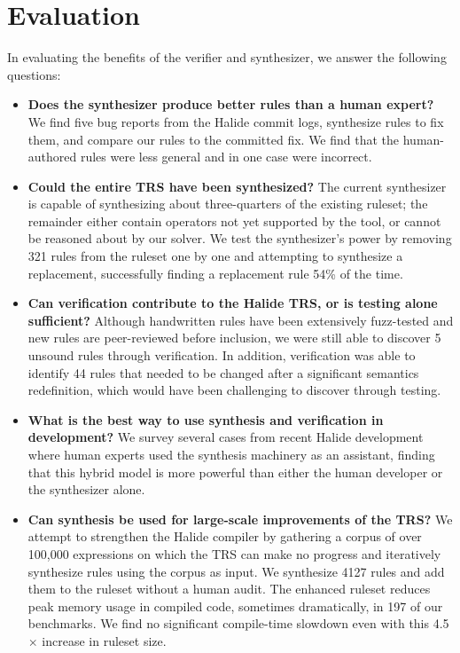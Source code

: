 \documentclass[acmsmall,review,anonymous]{acmart}\settopmatter{printfolios=true,printccs=false,printacmref=false}
\begin{document}
\section{Evaluation}

\newcommand{\PercentPossibleToSynth}{69\%}
\newcommand{\NumRulesInCorrectnessExperiment}{321}
\newcommand{\PercentRulesResynthesized}{54\%}

In evaluating the benefits of the verifier and synthesizer, we answer the following questions:

\begin{itemize}
  \item \textbf{Does the synthesizer produce better rules than a human expert?} We find five bug reports from the Halide commit logs, synthesize rules to fix them, and compare our rules to the committed fix. We find that the human-authored rules were less general and in one case were incorrect.
  \item \textbf{Could the entire TRS have been synthesized?} The current synthesizer is capable of synthesizing about three-quarters of the existing ruleset; the remainder either contain operators not yet supported by the tool, or cannot be reasoned about by our solver. We test the synthesizer's power by removing \NumRulesInCorrectnessExperiment{} rules from the ruleset one by one and attempting to synthesize a replacement, successfully finding a replacement rule \PercentRulesResynthesized{} of the time.
  \item \textbf{Can verification contribute to the Halide TRS, or is testing alone sufficient?} Although handwritten rules have been extensively fuzz-tested and new rules are peer-reviewed before inclusion, we were still able to discover 5 unsound rules through verification. In addition, verification was able to identify 44 rules that needed to be changed after a significant semantics redefinition, which would have been challenging to discover through testing.
  \item \textbf{What is the best way to use synthesis and verification in development?} We survey several cases from recent Halide development where human experts used the synthesis machinery as an assistant, finding that this hybrid model is more powerful than either the human developer or the synthesizer alone.
  \item \textbf{Can synthesis be used for large-scale improvements of the TRS?} We attempt to strengthen the Halide compiler by gathering a corpus of over 100,000 expressions on which the TRS can make no progress and iteratively synthesize rules using the corpus as input. We synthesize 4127 rules and add them to the ruleset without a human audit. The enhanced ruleset reduces peak memory usage in compiled code, sometimes dramatically, in 197 of our benchmarks. We find no significant compile-time slowdown even with this 4.5$\times$ increase in ruleset size.
\end{itemize}
\end{document}
